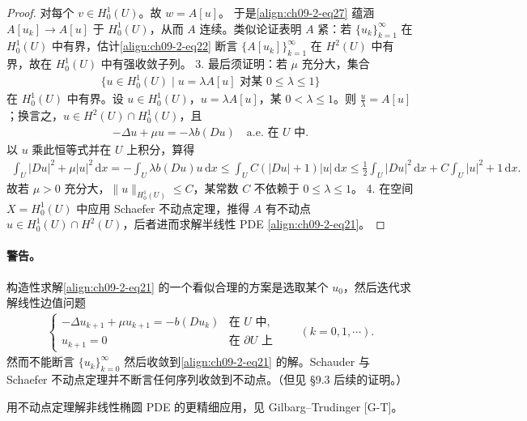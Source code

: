 \documentclass[../../main.tex]{subfiles}
\begin{document}
\begin{example}
\begin{theorem}[存在性]
\begin{proof}
对每个 $v\in H_0^1(U)$。故 $w=A[u]$。
于是\eqref{align:ch09-2-eq27} 蕴涵 $A[u_k]\to A[u]$ 于 $H_0^1(U)$，从而 $A$ 连续。类似论证表明 $A$ 紧：若 $\{u_k\}_{k=1}^\infty$ 在 $H_0^1(U)$ 中有界，估计\eqref{align:ch09-2-eq22} 断言 $\{A[u_k]\}_{k=1}^\infty$ 在 $H^2(U)$ 中有界，故在 $H_0^1(U)$ 中有强收敛子列。
3. 最后须证明：若 $\mu$ 充分大，集合
\begin{align*}
\{u\in H_0^1(U)\mid u=\lambda A[u]\text{ 对某 }0\leqslant\lambda\leqslant 1\}
\end{align*}
在 $H_0^1(U)$ 中有界。设 $u\in H_0^1(U)$，$u=\lambda A[u]$，某 $0<\lambda\leqslant 1$。则 $\frac u\lambda=A[u]$；换言之，$u\in H^2(U)\cap H_0^1(U)$，且
\begin{align*}
-\Delta u+\mu u=-\lambda b(Du)\quad\text{a.e. 在 }U\text{ 中}.
\end{align*}
以 $u$ 乘此恒等式并在 $U$ 上积分，算得
\begin{align*}
\int_U|Du|^2+\mu|u|^2\,\mathrm{d}x=-\int_U\lambda b(Du)u\,\mathrm{d}x\leqslant\int_U C(|Du|+1)|u|\,\mathrm{d}x\leqslant\frac12\int_U|Du|^2\,\mathrm{d}x+C\int_U|u|^2+1\,\mathrm{d}x.
\end{align*}
故若 $\mu>0$ 充分大，$\|u\|_{H_0^1(U)}\leqslant C$，某常数 $C$ 不依赖于 $0\leqslant\lambda\leqslant 1$。
4. 在空间 $X=H_0^1(U)$ 中应用 Schaefer 不动点定理，推得 $A$ 有不动点 $u\in H_0^1(U)\cap H^2(U)$，后者进而求解半线性 PDE \eqref{align:ch09-2-eq21}。
\end{proof}
\end{theorem}
\end{example}

\paragraph{警告。}构造性求解\eqref{align:ch09-2-eq21} 的一个看似合理的方案是选取某个 $u_0$，然后迭代求解线性边值问题
\begin{align*}
\begin{cases}
-\Delta u_{k+1}+\mu u_{k+1}=-b(Du_k)&\text{在 }U\text{ 中},\\
u_{k+1}=0&\text{在 }\partial U\text{ 上}
\end{cases}\qquad (k=0,1,\cdots).
\end{align*}
然而不能断言 $\{u_k\}_{k=0}^\infty$ 然后收敛到\eqref{align:ch09-2-eq21} 的解。Schauder 与 Schaefer 不动点定理并不断言任何序列收敛到不动点。（但见 \S9.3 后续的证明。）

用不动点定理解非线性椭圆 PDE 的更精细应用，见 Gilbarg--Trudinger [G-T]。
\end{document}
